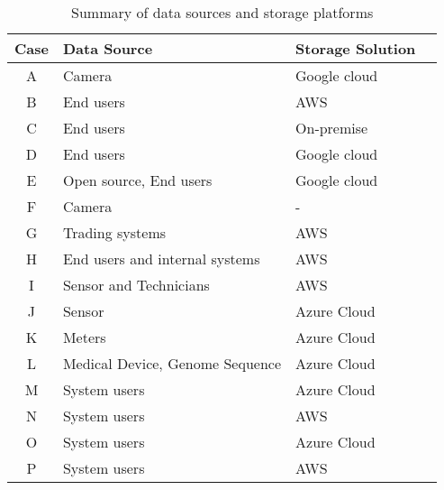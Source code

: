 \begin{table}[h]
  \centering
  \caption{Summary of data sources and storage platforms}
  \begin{tabular}{clll}
    \hline
    {Case} & {Data Source} & {Storage Solution} \\
    \hline
    A & Camera & Google cloud \\
    B & End users & AWS \\
    C & End users & On-premise \\
    D & End users & Google cloud \\
    E & Open source, End users & Google cloud\\
    F & Camera & - \\
    G & Trading systems & AWS \\
    H & End users and internal systems & AWS \\
    I & Sensor  and Technicians & AWS \\
    J & Sensor & Azure Cloud \\
    K & Meters & Azure Cloud \\
    L & Medical Device,  Genome Sequence & Azure Cloud \\
    M & System users & Azure Cloud \\
    N & System users & AWS \\
    O & System users & Azure Cloud \\
    P & System users & AWS \\
    \hline
    \end{tabular}%
  \label{tab:data_collect_store}%
\end{table}%
